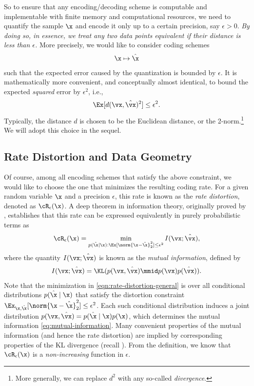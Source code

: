 \documentclass[../../book-main.tex]{subfiles}
\begin{document}
So to ensure that any encoding/decoding scheme is computable and implementable
with finite memory and computational resources, we need to quantify the sample $\x$ and encode it only up to a certain precision, say $\epsilon > 0$. {\em By doing so, in essence, we treat any two data points equivalent if their distance is less than $\epsilon$.} More precisely, we would like to consider coding schemes
\begin{equation}
	\x \mapsto \hat \x
\end{equation}
such that the expected error caused by the quantization is bounded by $\epsilon$. It is mathematically more convenient, and conceptually almost identical, to bound the expected \textit{squared} error by \(\epsilon^{2}\), i.e., 
\begin{equation}
	\Ex[d(\vx, \hat \vx)^{2}] \le \epsilon^{2}.
\end{equation}
Typically, the distance \(d\) is chosen to be the Euclidean distance, or the
2-norm.\footnote{More generally, we can replace \(d^{2}\) with any so-called
\textit{divergence}.} We will adopt this choice in the sequel.

\subsection{Rate Distortion and Data Geometry}
Of course, among all encoding schemes that satisfy the above constraint, we
would like to choose the one that minimizes the resulting coding rate. For
a given random variable $\x$ and a precision $\epsilon$, this rate is known as
the {\em rate distortion}, denoted as $\cR_{\epsilon}(\x)$. 
A deep theorem in information theory, originally proved by
\textcite{shannon1959coding}, establishes that this rate can be expressed
equivalently in purely probabilistic terms as
\begin{equation}
	\cR_{\epsilon}(\x) 
	= \min_{p(\hat \x \mid \x): \Ex[\norm{\x -\hat \x}_2^{2}] \le \epsilon^{2}} 
	I(\vx; \hat{\vx}),
    \label{eqn:rate-distortion-general}
\end{equation}
where the quantity $I(\vx; \hat{\vx})$ is known as the \textit{mutual
information}, defined by
\begin{equation}\label{eq:mutual-information}
	I(\vx; \hat{\vx})
	= \KL(p(\vx, \hat{\vx}) \mmid p(\vx) p(\hat{\vx})).
\end{equation}
Note that the minimization
in \eqref{eqn:rate-distortion-general} is over all conditional distributions $p(\hat \x \mid \x)$
that satisfy the distortion constraint $\Ex_{\x, \hat \x}[\norm{\x- \hat \x}_2^{2}] \le \epsilon^{2}$. 
Each such conditional distribution induces a joint distribution $p(\vx,
\hat{\vx}) = p(\hat\x \mid \x) p(\x)$, which determines the mutual
information \eqref{eq:mutual-information}.
Many convenient properties of the mutual information (and hence the rate
distortion) are implied by corresponding properties of the KL divergence (recall
).
From the definition, we know that $\cR_{\epsilon}(\x)$ is a {\em non-increasing}
function in $\epsilon$.
\end{document}
